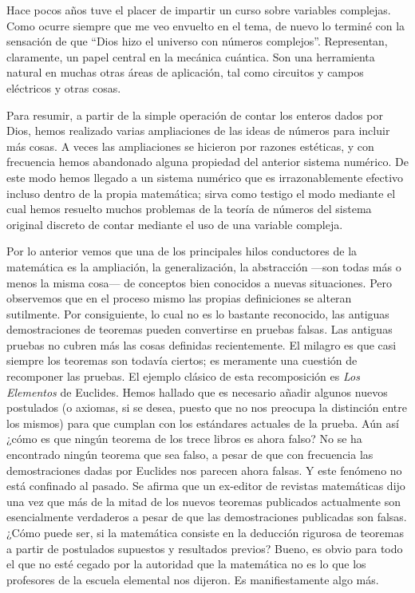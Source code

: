 \documentclass[a4paper, 12pt]{article}
\begin{document}
 

Hace pocos años tuve el placer de impartir un curso sobre variables complejas. Como ocurre siempre que me veo envuelto en el tema, de nuevo lo terminé con la sensación de que ``Dios hizo el universo con números complejos''. Representan, claramente, un papel central en la mecánica cuántica. Son una herramienta natural en muchas otras áreas de aplicación, tal como circuitos y campos  eléctricos y otras cosas.

 

Para resumir, a partir de la simple operación de contar los enteros dados por Dios, hemos realizado varias ampliaciones de las ideas de números para incluir más cosas. A veces las ampliaciones se hicieron por razones estéticas, y con frecuencia hemos abandonado alguna propiedad del anterior sistema numérico. De este modo hemos llegado a un sistema numérico que es irrazonablemente efectivo incluso dentro de la propia matemática; sirva como testigo el modo mediante el cual hemos resuelto muchos problemas de la teoría de números del sistema original discreto de contar mediante el uso de una variable compleja.

 

Por lo anterior vemos que una de los principales hilos conductores de la matemática es la ampliación, la generalización, la abstracción ---son todas más o menos la misma cosa--- de conceptos bien conocidos a nuevas situaciones. Pero observemos que en el proceso mismo las propias definiciones se alteran sutilmente. Por consiguiente, lo cual no es lo bastante reconocido, las antiguas demostraciones de teoremas pueden convertirse en pruebas falsas. Las antiguas pruebas no cubren más las cosas definidas recientemente. El milagro es que casi siempre los teoremas son todavía ciertos; es meramente una cuestión de recomponer las pruebas. El ejemplo clásico de esta recomposición es {\it Los Elementos} de Euclides. Hemos hallado que es necesario añadir algunos nuevos postulados (o axiomas, si se desea, puesto que no nos preocupa la distinción entre los mismos) para que cumplan con los estándares actuales de la prueba. Aún así ¿cómo es que ningún teorema de los trece libros es ahora falso? No se ha encontrado ningún teorema que sea falso, a pesar de que con frecuencia las demostraciones dadas por Euclides nos parecen ahora falsas. Y este fenómeno no está confinado al pasado. Se afirma que un ex-editor de revistas matemáticas dijo una vez que más de la mitad de los nuevos teoremas publicados actualmente son esencialmente verdaderos a pesar de que las demostraciones publicadas son falsas. ¿Cómo puede ser, si la matemática consiste en la deducción rigurosa de teoremas a partir de postulados supuestos y resultados previos? Bueno, es obvio para todo el que no esté cegado por la autoridad que la matemática no es lo que los profesores de la escuela elemental nos dijeron. Es manifiestamente algo más.
\end{document}
